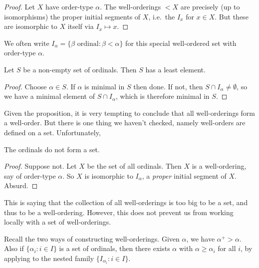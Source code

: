 \documentclass[a4paper]{article}
\begin{document}
\begin{proof}
  Let \(X\) have order-type \(\alpha\). The well-orderings \(< X\) are precisely (up to isomorphisms) the proper initial segments of \(X\), i.e.\ the \(I_x\) for \(x \in X\). But these are isomorphic to \(X\) itself via \(I_x \mapsto x\).
\end{proof}

\begin{notation}
  We often write \(I_\alpha = \{\beta \text{ ordinal}: \beta < \alpha\}\) for this special well-ordered set with order-type \(\alpha\).
\end{notation}

\begin{proposition}
  \label{prop:set of ordinals is well-ordered}
  Let \(S\) be a non-empty set of ordinals. Then \(S\) has a least element.
\end{proposition}

\begin{proof}
  Choose \(\alpha \in S\). If \(\alpha\) is minimal in \(S\) then done. If not, then \(S \cap I_\alpha \neq \emptyset\), so we have a minimal element of \(S \cap I_\alpha\), which is therefore minimal in \(S\).
\end{proof}

Given the proposition, it is very tempting to conclude that all well-orderings form a well-order. But there is one thing we haven't checked, namely well-orders are defined on a set. Unfortunately,

\begin{theorem}
  The ordinals do not form a set.
\end{theorem}

\begin{proof}
  Suppose not. Let \(X\) be the set of all ordinals. Then \(X\) is a well-ordering, say of order-type \(\alpha\). So \(X\) is isomorphic to \(I_\alpha\), a \emph{proper} initial segment of \(X\). Absurd.
\end{proof}

This is saying that the collection of all well-orderings is too big to be a set, and thus to be a well-ordering. However, this does not prevent us from working locally with a set of well-orderings.

Recall the two ways of constructing well-orderings. Given \(\alpha\), we have \(\alpha^+ > \alpha\). Also if \(\{\alpha_i: i \in I\}\) is a set of ordinals, then there exists \(\alpha\) with \(\alpha \geq \alpha_i\) for all \(i\), by applying  to the nested family \(\{I_{\alpha_i}: i \in I\}\).
\end{document}
